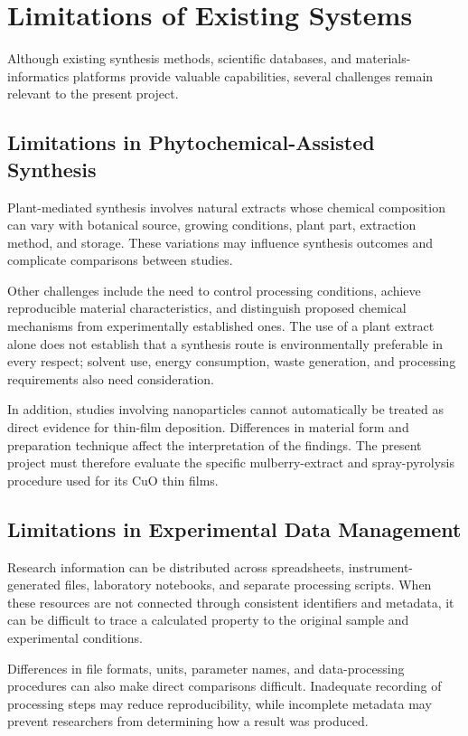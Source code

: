 \documentclass[12pt,a4paper,oneside]{report}
\begin{document}
{{{\section{Limitations of Existing Systems}

Although existing synthesis methods, scientific databases, and materials-informatics platforms provide valuable capabilities, several challenges remain relevant to the present project.

\subsection{Limitations in Phytochemical-Assisted Synthesis}

Plant-mediated synthesis involves natural extracts whose chemical composition can vary with botanical source, growing conditions, plant part, extraction method, and storage. These variations may influence synthesis outcomes and complicate comparisons between studies.

Other challenges include the need to control processing conditions, achieve reproducible material characteristics, and distinguish proposed chemical mechanisms from experimentally established ones. The use of a plant extract alone does not establish that a synthesis route is environmentally preferable in every respect; solvent use, energy consumption, waste generation, and processing requirements also need consideration.

In addition, studies involving nanoparticles cannot automatically be treated as direct evidence for thin-film deposition. Differences in material form and preparation technique affect the interpretation of the findings. The present project must therefore evaluate the specific mulberry-extract and spray-pyrolysis procedure used for its $\text{CuO}$ thin films.

\subsection{Limitations in Experimental Data Management}

Research information can be distributed across spreadsheets, instrument-generated files, laboratory notebooks, and separate processing scripts. When these resources are not connected through consistent identifiers and metadata, it can be difficult to trace a calculated property to the original sample and experimental conditions.

Differences in file formats, units, parameter names, and data-processing procedures can also make direct comparisons difficult. Inadequate recording of processing steps may reduce reproducibility, while incomplete metadata may prevent researchers from determining how a result was produced.

}}}
\end{document}
